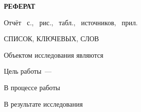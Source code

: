 \begin{center}
  \Large{\textbf{РЕФЕРАТ}}
\end{center}

Отчёт ~с., ~рис.,
~табл., ~источников,
~прил.

СПИСОК, КЛЮЧЕВЫХ, СЛОВ

Объектом исследования являются

Цель работы~--- 

В процессе работы

В результате исследования
\newpage



